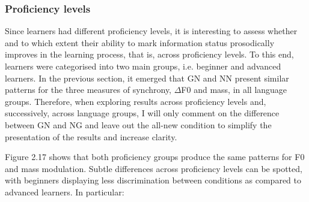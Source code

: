 \subsubsection[Proficiency levels]{Proficiency levels}
\hypertarget{Toc191305909}{}\begin{styleStandard}
Since learners had different proficiency levels, it is interesting to assess whether and to which extent their ability to mark information status prosodically improves in the learning process, that is, across proficiency levels. To this end, learners were categorised into two main groups, i.e. beginner and advanced learners. In the previous section, it emerged that GN and NN present similar patterns for the three measures of synchrony, ${\Delta}$F0 and mass, in all language groups. Therefore, when exploring results across proficiency levels and, successively, across language groups, I will only comment on the difference between GN and NG and leave out the all-new condition to simplify the presentation of the results and increase clarity.
\end{styleStandard}

\begin{styleStandard}
Figure 2.17 shows that both proficiency groups produce the same patterns for F0 and mass modulation. Subtle differences across proficiency levels can be spotted, with beginners displaying less discrimination between conditions as compared to advanced learners. In particular:
\end{styleStandard}

